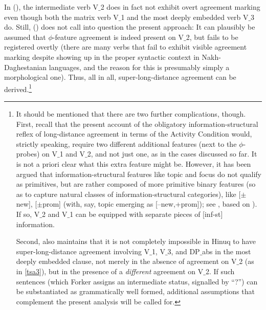 \documentclass[output=paper
,modfonts
,nonflat]{langsci/langscibook}
\begin{document}
In (\Last), the intermediate verb V$\_$2 does in fact not exhibit overt
agreement marking even though both the matrix verb V$\_$1 and the most
deeply embedded verb V$\_$3 do. Still, (\Last) does not call into question
the present approach: It can plausibly be assumed that $\phi$-feature
agreement is indeed present on V$\_$2, but fails to be registered overtly
(there are many verbs that fail to exhibit visible agreement marking
despite showing up in the proper syntactic context in
Nakh-Daghestanian languages, and the reason for this is presumably
simply a morphological one). Thus, all in all, super-long-distance
agreement can be derived.\footnote{It should be mentioned that there
  are two further complications, though. First, recall that the
  present account of the obligatory information-structural reflex of
  long-distance agreement in terms of the Activity Condition would,
  strictly speaking, require two different additional features (next
  to the $\phi$-probes) on V$\_$1 and V$\_$2, and not just one, as in the
  cases discussed so far. It is not a priori clear what
  this extra feature might be. However, it has been argued that
  information-structural features like topic and focus do not qualify
  as primitives, but are rather composed of more primitive binary
  features (so as to capture natural classes of information-structural
  categories), like [$\pm$new], [$\pm$prom] (with, say, topic emerging
  as [--new,+prom]); see \cite{Choi:99}, based on
  \cite{Vallduvi:92}). If so, V$\_$2 and V$\_$1 can be equipped with
  separate pieces of [inf-st] information.

Second, \cite{Forker:11} also maintains that it is not completely
impossible in Hinuq to have super-long-distance agreement involving
V$\_$1, V$\_$3, and DP$\_${abs} in the most deeply embedded clause, not merely
in the absence of agreement on V$\_$2 (as in \ref{tsa3}), but in the presence of a {\it
  different} agreement on V$\_$2.  If such sentences (which  Forker assigns
an intermediate status, signalled by ``?'') can be substantiated as
grammatically well formed, additional assumptions that complement the
present analysis will be called for.}
\end{document}
